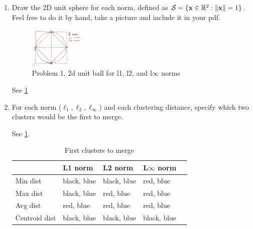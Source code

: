 \documentclass[submit]{harvardml}
\newenvironment{answer}{%
\color{answergreen}\sffamily\large}{}
\begin{document}
\begin{enumerate}
    \item Draw the 2D unit sphere for each norm,
        defined as $\mathcal{S} = \{\mathbf{x} \in \mathbb{R}^2: \|\mathbf{x}\| = 1 \}$. Feel free to do
        it by hand, take a picture and include it in your pdf.

        \begin{answer}
            \begin{figure}
                \centering
                \includegraphics[width=0.25\textwidth]{p1_norms.jpg}
                \caption{Problem 1, 2d unit ball for l1, l2, and l$\infty$ norms}
                \label{p1}
            \end{figure}
        See \cref{p1}
        \end{answer}

    \item  For each norm ($\ell_1, \ell_2, \ell_\infty$) and each clustering distance, specify which
        two clusters would be the first to merge.

        \begin{answer}
            See \cref{firstmerge}.

            \begin{table}[h]
                \centering
                \caption{First clusters to merge}
                \label{firstmerge}
                \begin{tabular}{@{}lllll@{}}
                    \toprule
                    & L1 norm     & L2 norm     & L$\infty$ norm     &  \\ \midrule
                    \multicolumn{1}{l|}{Min dist}      & black, blue & black, blue & red, blue   &
                    \\
                    \multicolumn{1}{l|}{Max dist}      & black, blue & red, blue & red, blue   &
                    \\
                    \multicolumn{1}{l|}{Avg dist}      & red, blue   & red, blue   & red, blue   &
                    \\
                    \multicolumn{1}{l|}{Centroid dist} & black, blue & black, blue & black, blue &
                    \\ \bottomrule
                \end{tabular}
            \end{table}
        \end{answer}


\end{enumerate}
\end{document}
